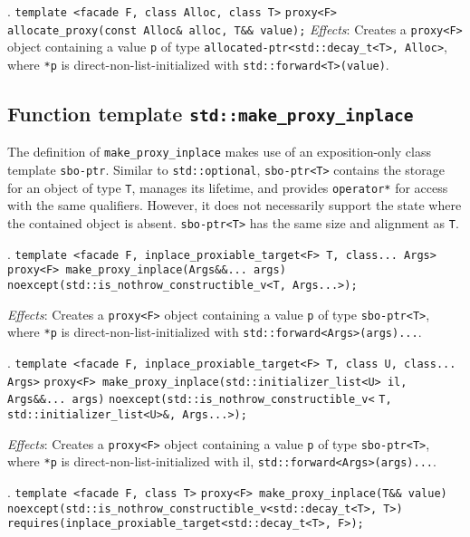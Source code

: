 \documentclass[10pt, a4paper, oneside]{article}
\begin{document}
. \verb|template <facade F, class Alloc, class T>|\smallbreak
\indent \verb|proxy<F> allocate_proxy(const Alloc& alloc, T&& value);|
\medbreak
\textit{Effects}: Creates a \verb|proxy<F>| object containing a value \verb|p| of type \verb|allocated-ptr<std::decay_t<T>, Alloc>|,
where \verb|*p| is direct\hyp{}non\hyp{}list\hyp{}initialized with \verb|std::forward<T>(value)|.

\subsection{Function template \texttt{std::make\_proxy\_inplace}}
The definition of \verb|make_proxy_inplace| makes use of an exposition-only class template \verb|sbo-ptr|.
Similar to \verb|std::optional|, \verb|sbo-ptr<T>| contains the storage for an object of type \verb|T|, manages its lifetime,
and provides \verb|operator*| for access with the same qualifiers.
However, it does not necessarily support the state where the contained object is absent.
\verb|sbo-ptr<T>| has the same size and alignment as \verb|T|.\medbreak

. \verb|template <facade F, inplace_proxiable_target<F> T, class... Args>|\smallbreak
\indent \verb|proxy<F> make_proxy_inplace(Args&&... args)|\smallbreak
\indent \indent \verb|noexcept(std::is_nothrow_constructible_v<T, Args...>);|

\textit{Effects}: Creates a \verb|proxy<F>| object containing a value \verb|p| of type \verb|sbo-ptr<T>|, 
where \verb|*p| is direct\hyp{}non\hyp{}list\hyp{}initialized with \verb|std::forward<Args>(args)...|.
\medbreak

. \verb|template <facade F, inplace_proxiable_target<F> T, class U, class... Args>|\smallbreak
\indent \verb|proxy<F> make_proxy_inplace(std::initializer_list<U> il, Args&&... args)|\smallbreak
\indent \indent \verb|noexcept(std::is_nothrow_constructible_v<|\smallbreak
\indent \indent \indent \verb|T, std::initializer_list<U>&, Args...>);|

\textit{Effects}: Creates a \verb|proxy<F>| object containing a value \verb|p| of type \verb|sbo-ptr<T>|,
where \verb|*p| is direct\hyp{}non\hyp{}list\hyp{}initialized with il, \verb|std::forward<Args>(args)...|.
\medbreak

. \verb|template <facade F, class T>|\smallbreak
\indent \verb|proxy<F> make_proxy_inplace(T&& value)|\smallbreak
\indent \indent \verb|noexcept(std::is_nothrow_constructible_v<std::decay_t<T>, T>)|\smallbreak
\indent \indent \verb|requires(inplace_proxiable_target<std::decay_t<T>, F>);|
\end{document}
